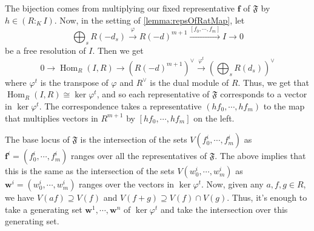 \documentclass[11pt]{amsart}%
\numberwithin{equation}{theorem}
\renewcommand{\:}{\colon}
\DeclareMathOperator{\homgp}{Hom}
\theoremstyle{theorem}
\begin{document}
The bijection comes from multiplying our fixed representative $\textbf{f}$ of $\mathfrak{F}$ by $h \in (R :_K I)$.
Now, in the setting of \autoref{lemma:repsOfRatMap}, let
  \[
    \bigoplus_s R(-d_s) \xrightarrow{\varphi} R(-d)^{m+1} \xrightarrow{[f_0, \cdots, f_m]} I \to 0
  \]
be a free resolution of $I$. Then we get
\[
  0 \to \homgp_R(I, R) \to \left( R(-d)^{m+1} \right)^\vee \xrightarrow{\varphi^t} \left( \bigoplus_s R(d_s) \right)^\vee
\]
where $\varphi^t$ is the transpose of $\varphi$ and $R^\vee$ is the dual module of $R$. Thus, we get that $\homgp_R(I,R) \cong \ker \varphi^t$, and so each representative of $\mathfrak{F}$ corresponds to a vector in $\ker \varphi^t$. The correspondence takes a representative $(hf_0, \cdots, hf_m)$ to the map that multiplies vectors in $R^{m+1}$ by $[hf_0, \cdots, hf_m]$ on the left.

The base locus of $\mathfrak{F}$ is the intersection of the sets $V(f^i_0, \cdots, f^i_m)$ as $\mathbf{f}^i = (f^i_0, \cdots, f^i_m)$ ranges over all the representatives of $\mathfrak{F}$. The above implies that this is the same as the intersection of the sets $V(w^i_0,\cdots, w^i_m)$ as $\mathbf{w}^i = (w^i_0, \cdots, w^i_m)$ ranges over the vectors in $\ker \varphi^t$. Now, given any $a, f, g\in R$, we have $V(af) \supseteq V(f)$ and $V(f + g) \supseteq V(f)\cap V(g)$. Thus, it's enough to take a generating set $\mathbf w^1, \cdots, \mathbf w^n$ of $\ker \varphi^t$  and take the intersection over this generating set.
\end{document}
